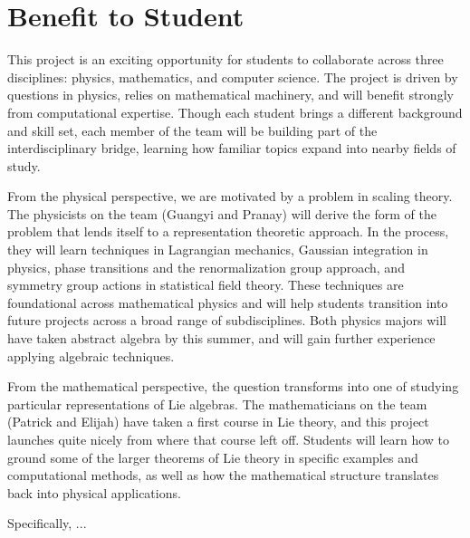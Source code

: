 \documentclass[11pt, reqno]{amsart}
\begin{document}
\section{Benefit to Student}

This project is an exciting opportunity for students to collaborate across three disciplines: physics, mathematics, and computer science. The project is driven by questions in physics, relies on mathematical machinery, and will benefit strongly from computational expertise. Though each student brings a different background and skill set, each member of the team will be building part of the interdisciplinary bridge, learning how familiar topics expand into nearby fields of study. 

From the physical perspective, we are motivated by a problem in scaling theory. The physicists on the team (Guangyi and Pranay) will derive the form of the problem that lends itself to a representation theoretic approach. In the process, they will learn techniques in Lagrangian mechanics, Gaussian integration in physics, phase transitions and the renormalization group approach, and symmetry group actions in statistical field theory. These techniques are foundational across mathematical physics and will help students transition into future projects across a broad range of subdisciplines. Both physics majors will have taken abstract algebra by this summer, and will gain further experience applying algebraic techniques.

From the mathematical perspective, the question transforms into one of studying particular representations of Lie algebras. The mathematicians on the team (Patrick and Elijah) have taken a first course in Lie theory, and this project launches quite nicely from where that course left off. Students will learn how to ground some of the larger theorems of Lie theory in specific examples and computational methods, as well as how the mathematical structure translates back into physical applications. 

Specifically, ...
\printbibliography
\end{document}
